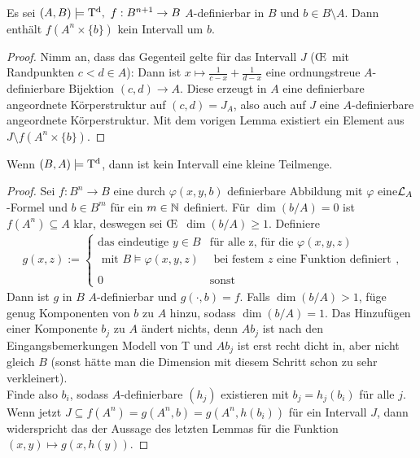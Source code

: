 \newpage

\begin{corollary}
	Es sei $(A,B)\models\td,\ f:B^{n+1}\rightarrow B$ $A$-definierbar in $B$ und $b\in B\setminus A$. Dann enthält $f(A^n\times\{b\})$ kein Intervall um $b$.
\end{corollary}
\begin{proof}
	Nimm an, dass das Gegenteil gelte für das Intervall $J$ (\OE\ mit Randpunkten $c<d\in A$): Dann ist $x\mapsto\frac{1}{c-x}+\frac{1}{d-x}$ eine ordnungstreue $A$-definierbare Bijektion $(c,d)\rightarrow A$. Diese erzeugt in $A$ eine definierbare angeordnete Körperstruktur auf $(c,d)=J_A$, also auch auf $J$ eine $A$-definierbare angeordnete Körperstruktur. Mit dem vorigen Lemma existiert ein Element aus $J\setminus f(A^n\times\{b\})$.
\end{proof}

\begin{theorem}\label{Kleinheit}
	Wenn $(B,A)\models\operatorname{T^d}$, dann ist kein Intervall eine kleine Teilmenge.
\end{theorem}
\begin{proof}
	Sei $f:B^n\rightarrow B$ eine durch $\varphi(x,y,b)$ definierbare Abbildung mit $\varphi$ eine\linebreak$\mathcal{L}_A$-Formel und $b\in B^m$ für ein $m\in\mathbb{N}$ definiert. Für $\dim(b/A)=0$ ist $f(A^n)\subseteq A$ klar, deswegen sei \OE\ $\dim(b/A)\geq1$. Definiere
	\begin{align*}
	g(x,z):=\left\{\begin{array}{ll}
	\text{das eindeutige }y\in B &\text{für alle z, für die }\varphi(x,y,z)\\
	\text{ mit }B\models\varphi(x,y,z) &\text{ bei festem }z\text{ eine Funktion definiert}\\
	\ &\ \\
	0 &\text{sonst}
	\end{array}\right.,
	\end{align*}
	Dann ist $g$ in $B$ $A$-definierbar und $g(\cdot,b)=f$. Falls $\dim(b/A)>1$, füge genug Komponenten von $b$ zu $A$ hinzu, sodass $\dim(b/A)=1$. Das Hinzufügen einer Komponente $b_j$ zu $A$ ändert nichts, denn $Ab_j$ ist nach den Eingangsbemerkungen Modell von T und $Ab_j$ ist erst recht dicht in, aber nicht gleich $B$ (sonst hätte man die Dimension mit diesem Schritt schon zu sehr verkleinert).\\
	Finde also $b_i$, sodass $A$-definierbare $(h_j)$ existieren mit $b_j=h_j(b_i)$ für alle $j$. Wenn jetzt $J\subseteq f(A^n)=g(A^n,b)=g(A^n,h(b_i))$ für ein Intervall $J$, dann widerspricht das der Aussage des letzten Lemmas für die Funktion $(x,y)\mapsto g(x,h(y))$.
\end{proof}


